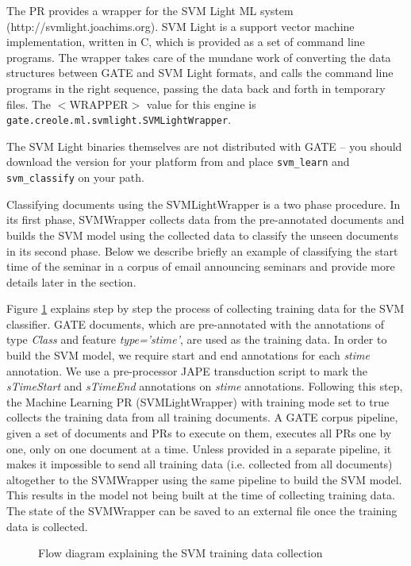 The PR provides a wrapper for the SVM Light ML system
(http://svmlight.joachims.org).  SVM Light is a support vector machine
implementation, written in C, which is provided as a set of command
line programs.  The wrapper takes care of the mundane work of
converting the data structures between GATE and SVM Light formats, and
calls the command line programs in the right sequence, passing the
data back and forth in temporary files.  The $<$WRAPPER$>$ value for
this engine is
\texttt{gate.creole.ml.svmlight.SVMLightWrapper}.

The SVM Light binaries themselves are not distributed with GATE -- you should
download the version for your platform from
 and place \texttt{svm\_learn} and
\texttt{svm\_classify} on your path.

Classifying documents using the SVMLightWrapper is a two phase procedure. In its
first phase, SVMWrapper collects data from the pre-annotated documents and
builds the SVM model using the collected data to classify the unseen documents
in its second phase. Below we describe briefly an example of classifying the
start time of the seminar in a corpus of email announcing seminars and provide
more details later in the section.

Figure \ref{fig:svmtrain} explains step by step the process of collecting
training data for the SVM classifier. GATE documents, which are pre-annotated
with the annotations of type \textit{Class} and feature \textit{type='stime'},
are used as the training data. In order to build the SVM model, we require start
and end annotations for each \textit{stime} annotation. We use a pre-processor
JAPE transduction script to mark the \textit{sTimeStart} and \textit{sTimeEnd}
annotations on \textit{stime} annotations. Following this step, the Machine
Learning PR (SVMLightWrapper) with training mode set to true collects the
training data from all training documents. A GATE corpus pipeline, given a set of
documents and PRs to execute on them, executes all PRs one by one, only on one
document at a time. Unless provided in a separate pipeline, it makes it
impossible to send all training data (i.e. collected from all documents)
altogether to the SVMWrapper using the same pipeline to build the SVM model.
This results in the model not being built at the time of collecting training
data. The state of the SVMWrapper can be saved to an external file once the
training data is collected.

\begin{figure}[h]
\caption{Flow diagram explaining the SVM training data collection}
\label{fig:svmtrain}
\end{figure}

